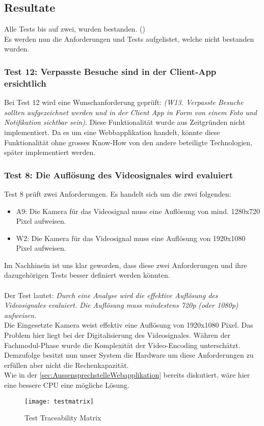 \subsection{Resultate}
Alle Tests bis auf zwei, wurden bestanden. ()
\\
Es werden nun die Anforderungen und Tests aufgelistet, welche nicht bestanden wurden.
\subsubsection{Test 12: Verpasste Besuche sind in der Client-App ersichtlich}
Bei Test 12 wird eine Wunschanforderung geprüft: \textit{(W13. Verpasste Besuche sollten aufgezeichnet werden und in der Client App in Form von einem Foto und Notifikation sichtbar sein)}. Diese Funktionalität wurde aus Zeitgründen nicht implementiert. Da es um eine Webbapplikation handelt, könnte diese Funktionalität ohne grosses Know-How von den andere beteiligte Technologien, später implementiert werden.

\subsubsection{Test 8: Die Auflösung des Videosignales wird evaluiert}
Test 8 prüft zwei Anforderungen. Es handelt sich um die zwei folgenden:
\begin{itemize}
	\item A9: Die Kamera für das Videosignal muss eine Auflösung von mind. 1280x720 Pixel aufweisen. 
	\item W2: Die Kamera für das Videosignal muss eine Auflösung von 1920x1080 Pixel aufweisen. 
\end{itemize}
Im Nachhinein ist uns klar geworden, dass diese zwei Anforderungen und ihre dazugehörigen Tests besser definiert werden könnten. 
\\
\\
Der Test lautet: \textit{ Durch eine Analyse wird die effektive Auflösung des Videosignales evaluiert. Die Auflösung muss mindestens 720p (oder 1080p) aufweisen.}
\\
Die Eingesetzte Kamera weist effektiv eine Auflösung von 1920x1080 Pixel. Das Problem hier liegt bei der Digitalisierung des Videosignales. Währen der Fachmodul-Phase wurde die Komplexität der Video-Encoding unterschätzt.
\\
Demzufolge besitzt nun unser System die Hardware um diese Anforderungen zu erfüllen aber nicht die Rechenkapazität.
\\
Wie in der \cref{sec:AussensprechstelleWebapplikation} bereits diskutiert, wäre hier eine bessere CPU eine mögliche Lösung.
\begin{figure}[htb!]
	\begin{center}
		\texttt{[image: testmatrix]}
		\caption[Test-Traceability Matrix]{Test Traceability Matrix}
		\label{fig:testmatrix}
	\end{center}
\end{figure}

\newpage